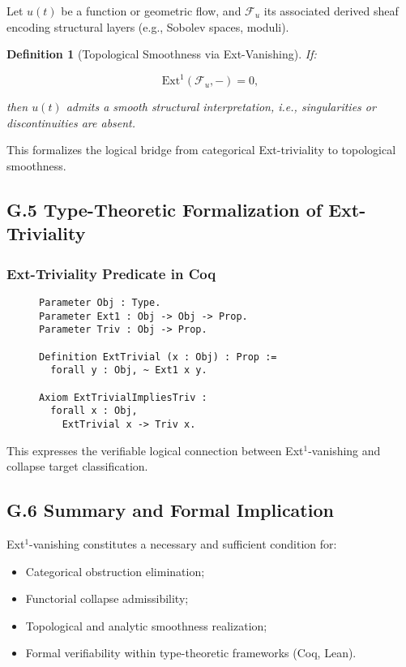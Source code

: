 \documentclass[11pt]{article}
\newtheorem{definition}[theorem]{Definition}
\begin{document}
Let \( u(t) \) be a function or geometric flow, and \( \mathcal{F}_u \) its associated derived sheaf encoding structural layers (e.g., Sobolev spaces, moduli).

\begin{definition}[Topological Smoothness via Ext-Vanishing]
If:

\[
\mathrm{Ext}^1(\mathcal{F}_u, -) = 0,
\]

then \( u(t) \) admits a smooth structural interpretation, i.e., singularities or discontinuities are absent.
\end{definition}

This formalizes the logical bridge from categorical Ext-triviality to topological smoothness.

\subsection*{G.5 Type-Theoretic Formalization of Ext-Triviality}

\subsubsection*{Ext-Triviality Predicate in Coq}

\begin{figure}[h]
\centering
\begin{lstlisting}[language=Coq, caption=Ext-Triviality and Collapse Formalization]
Parameter Obj : Type.
Parameter Ext1 : Obj -> Obj -> Prop.
Parameter Triv : Obj -> Prop.

Definition ExtTrivial (x : Obj) : Prop :=
  forall y : Obj, ~ Ext1 x y.

Axiom ExtTrivialImpliesTriv :
  forall x : Obj,
    ExtTrivial x -> Triv x.
\end{lstlisting}
\end{figure}

This expresses the verifiable logical connection between Ext$^1$-vanishing and collapse target classification.

\subsection*{G.6 Summary and Formal Implication}

Ext$^1$-vanishing constitutes a necessary and sufficient condition for:

\begin{itemize}
    \item Categorical obstruction elimination;
    \item Functorial collapse admissibility;
    \item Topological and analytic smoothness realization;
    \item Formal verifiability within type-theoretic frameworks (Coq, Lean).
\end{itemize}
\end{document}
